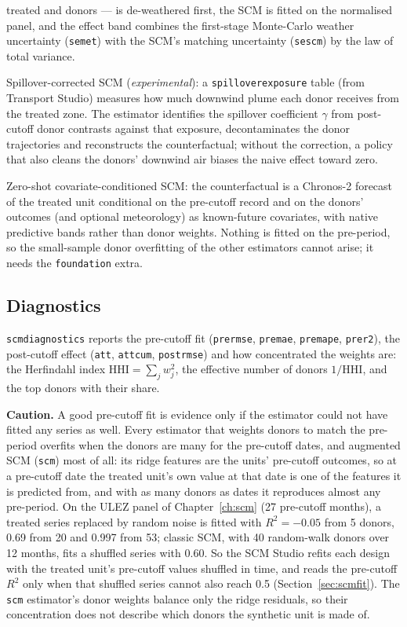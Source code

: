 \documentclass[11pt]{report}
\newcommand{\codeunderscore}{\textunderscore\allowbreak}
\newcommand{\code}[1]{\texttt{\let\_\codeunderscore #1}}
\newcommand{\caution}[1]{\par\noindent\colorbox{warn!15}{\parbox{0.97\linewidth}{\small\textbf{Caution.} #1}}\par}
\begin{document}
\begin{description}
        treated and donors --- is de-weathered first, the SCM is fitted on the
        normalised panel, and the effect band combines the first-stage Monte-Carlo
        weather uncertainty (\code{se\_met}) with the SCM's matching uncertainty
        (\code{se\_scm}) by the law of total variance.
  \item[\code{transport}] Spillover-corrected SCM (\emph{experimental}): a
        \code{spillover\_exposure} table (from Transport Studio) measures how much
        downwind plume each donor receives from the treated zone. The estimator
        identifies the spillover coefficient $\gamma$ from post-cutoff donor
        contrasts against that exposure, decontaminates the donor trajectories and
        reconstructs the counterfactual; without the correction, a policy that also
        cleans the donors' downwind air biases the naive effect toward zero.
  \item[\code{chronos}] Zero-shot covariate-conditioned SCM: the counterfactual is a
        Chronos-2 forecast of the treated unit conditional on the pre-cutoff record
        and on the donors' outcomes (and optional meteorology) as known-future
        covariates, with native predictive bands rather than donor weights. Nothing
        is fitted on the pre-period, so the small-sample donor overfitting of the
        other estimators cannot arise; it needs the \code{foundation} extra.
\end{description}

\subsection{Diagnostics}\label{sec:scmdiag}
\code{scm\_diagnostics} reports the pre-cutoff fit (\code{pre\_rmse}, \code{pre\_mae},
\code{pre\_mape}, \code{pre\_r2}), the post-cutoff effect (\code{att}, \code{att\_cum},
\code{post\_rmse}) and how concentrated the weights are: the Herfindahl index
$\text{HHI} = \sum_j w_j^2$, the effective number of donors $1/\text{HHI}$, and the top
donors with their share.

\caution{A good pre-cutoff fit is evidence only if the estimator could not have fitted
any series as well. Every estimator that weights donors to match the pre-period overfits
when the donors are many for the pre-cutoff dates, and augmented SCM (\code{scm}) most of
all: its ridge features are the units' pre-cutoff outcomes, so at a pre-cutoff date the
treated unit's own value at that date is one of the features it is predicted from, and
with as many donors as dates it reproduces almost any pre-period. On the ULEZ panel of
Chapter~\ref{ch:scm} (27 pre-cutoff months), a treated series replaced by random noise is
fitted with $R^2 = -0.05$ from 5 donors, 0.69 from 20 and 0.997 from 53; classic SCM, with
40 random-walk donors over 12 months, fits a shuffled series with 0.60. So the SCM Studio
refits each design with the treated unit's pre-cutoff values shuffled in time, and reads
the pre-cutoff $R^2$ only when that shuffled series cannot also reach 0.5
(Section~\ref{sec:scmfit}). The \code{scm} estimator's donor weights balance only the
ridge residuals, so their concentration does not describe which donors the synthetic unit
is made of.}
\end{document}
